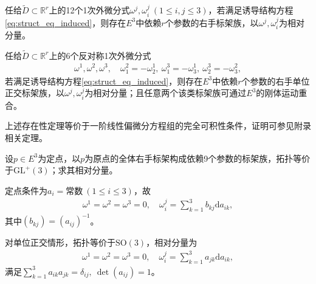\documentclass[../../main.tex]{subfiles}%
\begin{document}
\begin{theorem}
任给$\tilde{D}\subset\mathbb{R}^r$上的12个1次外微分式$\omega^j,\omega_i^j\ (1\leqslant i,j\leqslant3)$，若满足诱导结构方程\eqref{eq:struct_eq_induced}，则存在$E^3$中依赖$r$个参数的右手标架族，以$\omega^j,\omega_i^j$为相对分量。
\end{theorem}

\begin{theorem}
任给$\tilde{D}\subset\mathbb{R}^r$上的6个反对称1次外微分式
\begin{align*}
\omega^1,\omega^2,\omega^3,\quad \omega_1^2=-\omega_2^1,\ \omega_1^3=-\omega_3^1,\ \omega_2^3=-\omega_3^2,
\end{align*}
若满足诱导结构方程\eqref{eq:struct_eq_induced}，则存在$E^3$中依赖$r$个参数的右手单位正交标架族，以$\omega^j,\omega_i^j$为相对分量；且任意两个该类标架族可通过$E^3$的刚体运动重合。
\end{theorem}

\begin{remark}
上述存在性定理等价于一阶线性偏微分方程组的完全可积性条件，证明可参见附录相关定理。
\end{remark}

\begin{example}
设$p\in E^3$为定点，以$p$为原点的全体右手标架构成依赖9个参数的标架族，拓扑等价于$\mathrm{GL}^+(3)$；求其相对分量。
\end{example}
\begin{solution}
定点条件为$a_i=\text{常数}\ (1\leqslant i\leqslant3)$，故
\begin{align*}
\omega^1=\omega^2=\omega^3=0,\quad \omega_i^j=\sum\limits_{k=1}^3b_{kj}\mathrm{d}a_{ik},
\end{align*}
其中$(b_{kj})=(a_{ij})^{-1}$。

对单位正交情形，拓扑等价于$\mathrm{SO}(3)$，相对分量为
\begin{align*}
\omega^1=\omega^2=\omega^3=0,\quad \omega_i^j=\sum\limits_{k=1}^3a_{jk}\mathrm{d}a_{ik},
\end{align*}
满足$\sum\limits_{k=1}^3a_{ik}a_{jk}=\delta_{ij},\ \det(a_{ij})=1$。

\end{solution}
\end{document}
